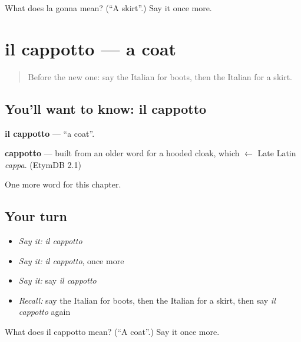 \begin{tcolorbox}[breakable,colback=teal!4,colframe=teal!35!black,title={Before you move on}]
What does la gonna mean? (\textquotedblleft{}A skirt\textquotedblright{}.) Say it once more.
\end{tcolorbox}
\section[il cappotto]{il cappotto — a coat}

\label{lesson:IT-C104-cappotto}



\begin{quote}
Before the new one: say the Italian for boots, then the Italian for a skirt.
\end{quote}

\subsection*{You'll want to know: il cappotto}
\textbf{il cappotto} — \textquotedblleft{}a coat\textquotedblright{}.

\begin{cousinweb}
\textbf{cappotto} — built from an older word for a hooded cloak, which $\leftarrow$ Late Latin \emph{cappa}. (EtymDB 2.1)
\end{cousinweb}

\begin{grammarlens}[title={What you've built}]
One more word for this chapter.
\end{grammarlens}

\subsection*{Your turn}
\begin{itemize}
\raggedright
  \item \emph{Say it:} \emph{il cappotto}
  \item \emph{Say it:} \emph{il cappotto}, once more
  \item \emph{Say it:} say \emph{il cappotto}
  \item \emph{Recall:} say the Italian for boots, then the Italian for a skirt, then say \emph{il cappotto} again
\end{itemize}

\begin{tcolorbox}[breakable,colback=teal!4,colframe=teal!35!black,title={Before you move on}]
What does il cappotto mean? (\textquotedblleft{}A coat\textquotedblright{}.) Say it once more.
\end{tcolorbox}
